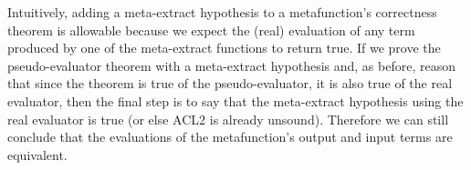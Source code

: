 Intuitively, adding a meta-extract hypothesis to a metafunction's
correctness theorem is allowable because we expect the (real)
evaluation of any term produced by one of the meta-extract functions
to return true.  If we prove the pseudo-evaluator theorem with a
meta-extract hypothesis and, as before, reason that since the theorem
is true of the pseudo-evaluator, it is also true of the real
evaluator, then the final step is to say that the meta-extract
hypothesis using the real evaluator is true (or else ACL2 is already
unsound).  Therefore we can still conclude that the evaluations of the
metafunction's output and input terms are equivalent.
